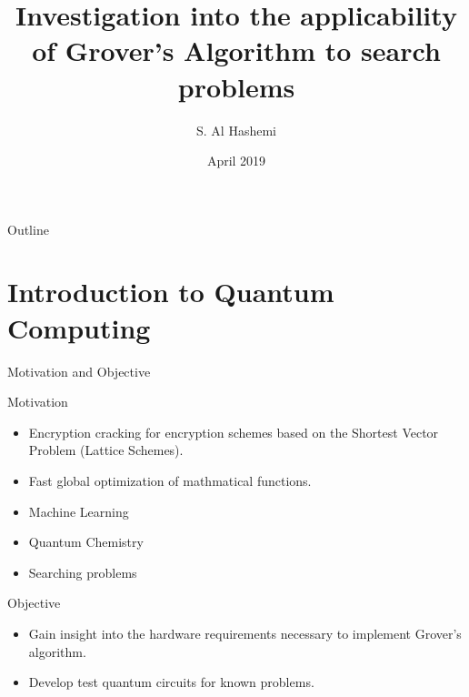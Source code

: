 \documentclass{beamer}
\title{Investigation into the applicability of Grover's Algorithm to search problems}
\author{S. Al Hashemi }
\institute[University of Toronto] %
{
  Engineering Science\\[1cm]{\small Supervisor: Prof. G. Gulak}
}
\date{April 2019}
\begin{document}
\begin{frame}
	\titlepage
\end{frame}

\begin{frame}{Outline}
	\tableofcontents
\end{frame}

\section{Introduction to Quantum Computing}

\begin{frame}{Motivation and Objective}
	\begin{block}{Motivation}
		\begin{multicols}{2}
			\begin{itemize}
				\item Encryption cracking for encryption schemes based on the Shortest Vector Problem (Lattice Schemes).
				\item Fast global optimization of mathmatical functions.
			\end{itemize}

			\columnbreak
			\begin{itemize}
				\item Machine Learning
				\item Quantum Chemistry
				\item Searching problems
			\end{itemize}
		\end{multicols}
	\end{block}
	\begin{exampleblock}{Objective}
		\begin{itemize}
			\item Gain insight into the hardware requirements necessary to implement Grover's algorithm.
			\item Develop test quantum circuits for known problems.
		\end{itemize}
	\end{exampleblock}
\end{frame}
\end{document}
